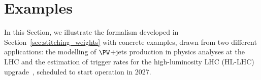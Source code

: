 \section{Examples}
\label{sec:examples}

In this Section, we illustrate the formalism developed in Section~\ref{sec:stitching_weights} with concrete examples,
drawn from two different applications: the modelling of $\PW$+jets production in physics analyses at the LHC
and the estimation of trigger rates for the high-luminosity LHC (HL-LHC) upgrade~\cite{TDR_Phase2_LHC},
scheduled to start operation in 2027.

